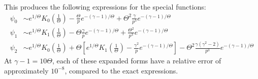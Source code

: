 \documentclass[11pt,a4paper]{article}
\newcommand{\rd}{\ensuremath{\mathrm{d}}}
\begin{document}
This produces the following expressions for the special functions:
\begin{align}
\psi_0 &\sim e^{1/\Theta}K_0\left(\frac{1}{\Theta}\right) - \frac{\Theta}{p} e^{-(\gamma-1)/\Theta} + \Theta^2\frac{\gamma}{ p^3}e^{-(\gamma-1)/\Theta} \nonumber \\
\psi_1 &\sim e^{1/\Theta}K_1\left(\frac{1}{\Theta}\right) - \Theta \frac{\gamma}{p}e^{-(\gamma-1)/\Theta} +\frac{\Theta^2 }{p^3}e^{-(\gamma-1)/\Theta}  \\
\psi_2 &\sim e^{1/\Theta}K_0\left(\frac{1}{\Theta}\right) + \Theta\left[ e^{1/\Theta} K_1\left(\frac{1}{\Theta}\right)  - \frac{\gamma^2}{p}e^{-(\gamma-1)/\Theta}\right] - \Theta^2 \frac{\gamma(\gamma^2-2)}{p^3} e^{-(\gamma-1)/\Theta}\nonumber
\end{align}
At $\gamma-1 = 10\Theta$, each of these expanded forms have a relative error of approximately $10^{-8}$, compared to the exact expressions.


%
\end{document}
